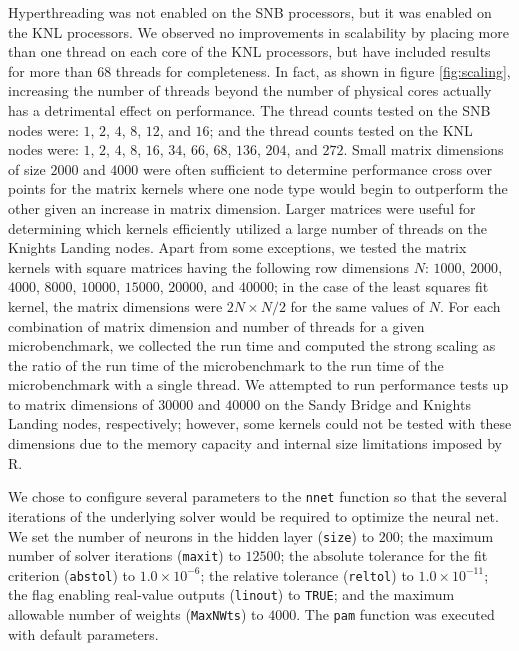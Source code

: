Hyperthreading was not enabled on the SNB processors, but it was enabled on the KNL
processors. We observed no improvements in scalability by placing more than one thread on
each core of the KNL processors, but have included results for more than 68 threads for
completeness. In fact, as shown in figure \ref{fig:scaling}, increasing the number of
threads beyond the number of physical cores actually has a detrimental effect on
performance. The thread counts tested on the SNB nodes were: $1$, $2$, $4$, $8$, $12$, and
$16$; and the thread counts tested on the KNL nodes were: $1$, $2$, $4$, $8$, $16$, $34$,
$66$, $68$, $136$, $204$, and $272$. Small matrix dimensions of size $2000$ and $4000$
were often sufficient to determine performance cross over points for the matrix kernels
where one node type would begin to outperform the other given an increase in matrix
dimension. Larger matrices were useful for determining which kernels efficiently utilized
a large number of threads on the Knights Landing nodes. Apart from some exceptions, we
tested the matrix kernels with square matrices having the following row dimensions $N$:
$1000$, $2000$, $4000$, $8000$, $10000$, $15000$, $20000$, and $40000$; in the case of the
least squares fit kernel, the matrix dimensions were $2N \times N/2$ for the same values
of $N$. For each combination of matrix dimension and number of threads for a given
microbenchmark, we collected the run time and computed the strong scaling as the ratio of
the run time of the microbenchmark to the run time of the microbenchmark with a single
thread. We attempted to run performance tests up to matrix dimensions of $30000$ and
$40000$ on the Sandy Bridge and Knights Landing nodes, respectively; however, some kernels
could not be tested with these dimensions due to the memory capacity and internal size
limitations imposed by R.

We chose to configure several parameters to the \texttt{nnet} function so that
  the several iterations of the underlying solver would be required to optimize
  the neural net.
We set the number of neurons in the hidden layer (\texttt{size}) to $200$;
  the maximum number of solver iterations (\texttt{maxit}) to $12500$;
  the absolute tolerance for the fit criterion (\texttt{abstol}) to $1.0\times 10^{-6}$;
  the relative tolerance (\texttt{reltol}) to $1.0\times 10^{-11}$;
  the flag enabling real-value outputs (\texttt{linout}) to \texttt{TRUE}; and
  the maximum allowable number of weights (\texttt{MaxNWts}) to $4000$.
The \texttt{pam} function was executed with default parameters.

